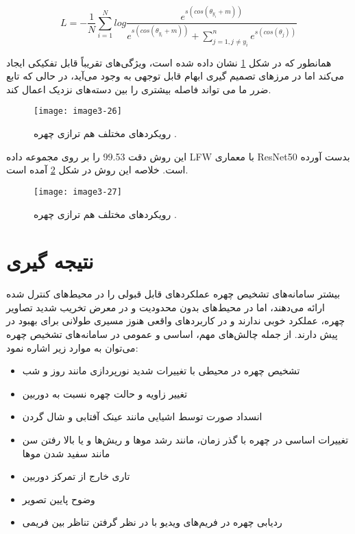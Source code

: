 \begin{equation}\label{eq3-15}
L = - \frac{1}{N} \sum_{i=1}^{N} log \frac{e^{s(cos(\theta_{y_i}+m))}}{e^{s(cos(\theta_{y_i}+m))} + \sum_{j=1, j\neq y_i}^{n} e^{s(cos(\theta_j))}}
\end{equation}

\noindent
همانطور که در شکل \ref{image3-26} نشان داده شده است،  ویژگی‌های تقریباً قابل تفکیکی ایجاد می‌کند اما در مرزهای تصمیم گیری ابهام قابل توجهی به وجود می‌آید، در حالی که تابع ضرر ما می تواند فاصله بیشتری را بین دسته‌های نزدیک اعمال کند.

\begin{figure}[h]
\centering
  \texttt{[image: image3-26]}
  \caption{رویکردهای مختلف هم ترازی چهره \cite{deng2019arcface}.}
  \label{image3-26}
\end{figure}

\noindent
این روش دقت 99.53 را بر روی مجموعه داده LFW با معماری ResNet50 بدست آورده است. خلاصه این روش در شکل \ref{image3-27} آمده است.

\begin{figure}[h]
\centering
  \texttt{[image: image3-27]}
  \caption{رویکردهای مختلف هم ترازی چهره \cite{deng2019arcface}.}
  \label{image3-27}
\end{figure}

\section{نتیجه گیری}
بیشتر سامانه‌های تشخیص چهره عملکردهای قابل قبولی را در محیط‌های کنترل شده ارائه می‌دهند، اما در محیط‌های بدون محدودیت و در معرض تخریب شدید تصاویر چهره، عملکرد خوبی ندارند و در کاربردهای واقعی هنوز مسیری طولانی برای بهبود در پیش دارند. از جمله چالش‌های مهم، اساسی و عمومی در سامانه‌های تشخیص چهره می‌توان به موارد زیر اشاره نمود:

\begin{itemize}
\item
تشخیص چهره در محیطی با تغییرات شدید نورپردازی مانند روز و شب 
 \item
تغییر زاویه و حالت چهره نسبت به دوربین 
 \item
انسداد صورت توسط اشیایی مانند عینک آفتابی و شال گردن 
 \item
تغییرات اساسی در چهره با گذر زمان، مانند رشد موها و ریش‌ها و یا بالا رفتن سن مانند سفید شدن موها 
 \item
تاری خارج از تمرکز دوربین 
 \item
وضوح پایین تصویر 
 \item
ردیابی چهره در فریم‌های ویدیو با در نظر گرفتن تناظر بین فریمی 
\end{itemize}

